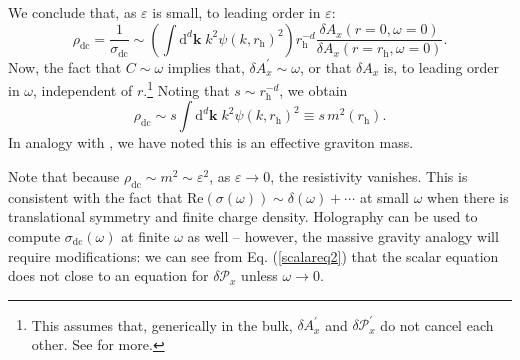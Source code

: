 \documentclass[10pt, oneside]{book}
\begin{document}
\begin{doublespace}
%
%
%
%
We conclude that, as $\varepsilon$ is small, to leading order in $\varepsilon$: \begin{equation}
\rho_{\mathrm{dc}} = \frac{1}{\sigma_{\mathrm{dc}}} \sim \left(\int \mathrm{d}^d\mathbf{k}\; k^2 \psi(k,r_{\mathrm{h}})^2\right) r_{\mathrm{h}}^{-d} \frac{\delta A_x(r=0,\omega=0)}{\delta A_x(r=r_{\mathrm{h}},\omega=0)}.
\end{equation}Now, the fact that $C \sim \omega$ implies that, $\delta A_x^\prime \sim \omega$, or that $\delta A_x$ is, to leading order in $\omega$, independent of $r$.\footnote{This assumes that, generically in the bulk, $\delta A_x^\prime$ and $\delta \mathcal{P}_x^\prime$ do not cancel each other.   See \cite{Blake:2013bqa, Blake:2013owa} for more.}   Noting that $s\sim r_{\mathrm{h}}^{-d}$, we obtain \begin{equation}
\rho_{\mathrm{dc}} \sim s \int \mathrm{d}^d\mathbf{k}\; k^2 \psi(k,r_{\mathrm{h}})^2 \equiv s\, m^2(r_{\mathrm{h}}).
\end{equation}
In analogy with \cite{Blake:2013owa}, we have noted this is an effective graviton mass.   

Note that because $\rho_{\mathrm{dc}} \sim m^2 \sim \varepsilon^2$, as $\varepsilon \rightarrow 0$, the resistivity vanishes.   This is consistent with the fact that  $\mathrm{Re}(\sigma(\omega)) \sim \delta(\omega) + \cdots$ at small $\omega$ when there is translational symmetry and finite charge density.  Holography can be used to compute $\sigma_{\mathrm{dc}}(\omega)$ at finite $\omega$ as well -- however, the massive gravity analogy will require modifications:  we can see from Eq. (\ref{scalareq2}) that the scalar equation does not close to an equation for $\delta \mathcal{P}_x$ unless $\omega\rightarrow 0$.






\end{doublespace}
\end{document}

